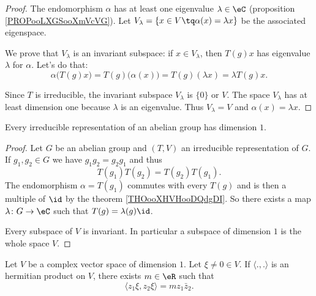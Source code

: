 \begin{proof}
    The endomorphism \( \alpha\) has at least one eigenvalue \( \lambda\in \eC\) (proposition \ref{PROPooLXGSooXmVcVG}). Let \( V_{\lambda}=\{ x\in V\tq \alpha(x)=\lambda x \}\) be the associated eigenspace.

    We prove that \( V_{\lambda}\) is an invariant subspace: if \( x\in V_{\lambda}\), then \( T(g)x\) has eigenvalue \( \lambda\) for \( \alpha\). Let's do that:
    \begin{equation}
        \alpha\big( T(g)x \big)=T(g)\big( \alpha(x) \big)=T(g)(\lambda x)=\lambda T(g)x.
    \end{equation}
    
    Since \( T\) is irreducible, the invariant subspace \( V_{\lambda}\) is \( \{ 0 \}\) or \( V\). The space \( V_{\lambda}\) has at least dimension one because \( \lambda\) is an eigenvalue. Thus \( V_{\lambda}=V\) and \( \alpha(x)=\lambda x\).
\end{proof}

\begin{theorem}       \label{THOooFFJGooCekFQc}
    Every irreducible representation of an abelian group has dimension \( 1\).
\end{theorem}

\begin{proof}
    Let \( G\) be an abelian group and \( (T,V)\) an irreducible representation of \( G\). If \( g_1,g_2\in G\) we have \( g_1g_2=g_2g_1\) and thus
    \begin{equation}
        T(g_1)T(g_2)=T(g_2)T(g_1).
    \end{equation}
    The endomorphism \( \alpha=T(g_1)\) commutes with every \( T(g)\) and is then a multiple of \( \id\) by the theorem \ref{THOooXHVHooDQdgDI}. So there exists a map \( \lambda\colon G\to \eC\) such that \( T(g)=\lambda(g)\id\).

    Every subspace of \( V\) is invariant. In particular a subspace of dimension \( 1\) is the whole space \( V\).
\end{proof}

\begin{proposition}
    Let \( V\) be a complex vector space of dimension \( 1\). Let \( \xi\neq 0\in V\). If \( \langle ., .\rangle \) is an hermitian product on \( V\), there exists \( m\in \eR\) such that
    \begin{equation}
        \langle z_1\xi, z_2\xi\rangle =mz_1\bar z_2.
    \end{equation}
\end{proposition}

